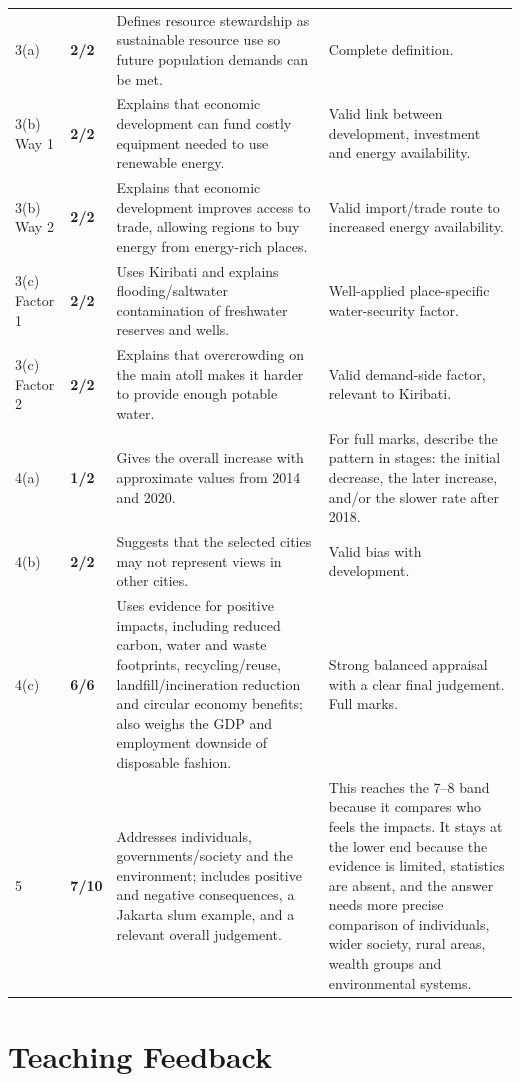 \documentclass[11pt]{article}
\newcommand{\markcell}[2]{\textbf{#1/#2}}
\begin{document}
\begin{longtable}{@{}p{} p{} p{} p{}@{}}
\midrule
3(a) & \markcell{2}{2} & Defines resource stewardship as sustainable resource use so future population demands can be met. & Complete definition. \\
3(b) Way 1 & \markcell{2}{2} & Explains that economic development can fund costly equipment needed to use renewable energy. & Valid link between development, investment and energy availability. \\
3(b) Way 2 & \markcell{2}{2} & Explains that economic development improves access to trade, allowing regions to buy energy from energy-rich places. & Valid import/trade route to increased energy availability. \\
3(c) Factor 1 & \markcell{2}{2} & Uses Kiribati and explains flooding/saltwater contamination of freshwater reserves and wells. & Well-applied place-specific water-security factor. \\
3(c) Factor 2 & \markcell{2}{2} & Explains that overcrowding on the main atoll makes it harder to provide enough potable water. & Valid demand-side factor, relevant to Kiribati. \\
\midrule
4(a) & \markcell{1}{2} & Gives the overall increase with approximate values from 2014 and 2020. & For full marks, describe the pattern in stages: the initial decrease, the later increase, and/or the slower rate after 2018. \\
4(b) & \markcell{2}{2} & Suggests that the selected cities may not represent views in other cities. & Valid bias with development. \\
4(c) & \markcell{6}{6} & Uses evidence for positive impacts, including reduced carbon, water and waste footprints, recycling/reuse, landfill/incineration reduction and circular economy benefits; also weighs the GDP and employment downside of disposable fashion. & Strong balanced appraisal with a clear final judgement. Full marks. \\
\midrule
5 & \markcell{7}{10} & Addresses individuals, governments/society and the environment; includes positive and negative consequences, a Jakarta slum example, and a relevant overall judgement. & This reaches the 7--8 band because it compares who feels the impacts. It stays at the lower end because the evidence is limited, statistics are absent, and the answer needs more precise comparison of individuals, wider society, rural areas, wealth groups and environmental systems. \\
\bottomrule
\end{longtable}

\section*{Teaching Feedback}
\end{document}
